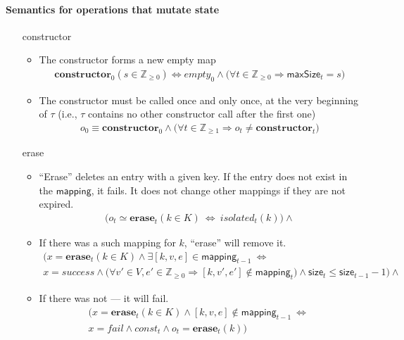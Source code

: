 \documentclass{article}
\renewcommand{\o}[1]{\ensuremath{\mathbf{#1}}}
\newcommand{\p}[1]{\ensuremath{\mathit{#1}}}
\newcommand{\s}[1]{\ensuremath{\mathsf{#1}}}
\newcommand{\nintset}{\ensuremath{\mathds{Z}_{\ge 0}}}
\newcommand{\moreset}[1]{\ensuremath{\mathds{Z}_{\ge #1}}}
\begin{document}
\paragraph{Semantics for operations that mutate state}
\begin{itemize}
\item[constructor]
  \begin{itemize}
  \item The constructor forms a new empty map
    \begin{gather*}
      \o{constructor}_0(s \in \nintset) \Leftrightarrow \p{empty}_0 \wedge \big(\forall t \in \nintset \Rightarrow \s{maxSize}_t=s\big)
    \end{gather*}
  \item The constructor must be called once and only once, at the very beginning of $\tau$ (i.e., $\tau$ contains no other constructor call after the first one)
    \begin{gather*}
      o_0 \equiv \o{constructor}_0 \wedge \big(\forall t\in \moreset{1} \Rightarrow o_t \neq \o{constructor}_t\big)
    \end{gather*}
  \end{itemize}
\item[erase]
  \begin{itemize}
  \item ``Erase'' deletes an entry with a given key. If the entry does not exist in the \s{mapping}, it fails. It does not change other mappings if they are not expired.
    \begin{gather*}
      \Big(o_t \simeq \o{erase}_t(k\in K) ~\Leftrightarrow~ \p{isolated}_t(k)\Big) \wedge
    \end{gather*}
  \item If there was a such mapping for $k$, ``erase'' will remove it.
    \begin{gather}
      \Big(x=\o{erase}_t(k\in K) \wedge \exists [k, v, e] \in \s{mapping}_{t-1} ~\Leftrightarrow~\nonumber\\
      x=success \wedge \big(\forall v'\in V, e'\in \nintset \Rightarrow [k, v', e'] \not\in \s{mapping}_t\big) \wedge \s{size}_t \le \s{size}_{t-1}-1 \Big) \wedge
      \label{eq:erase1}
    \end{gather}
  \item If there was not --- it will fail.
    \begin{gather}
      \Big( x=\o{erase}_t(k\in K) \wedge [k,v,e]\not\in \s{mapping}_{t-1} ~\Leftrightarrow~ \nonumber\\
      x=fail \wedge \p{const}_t \wedge o_t=\o{erase}_t(k)\Big)

\end{gather}
\end{itemize}
\end{itemize}
\end{document}
